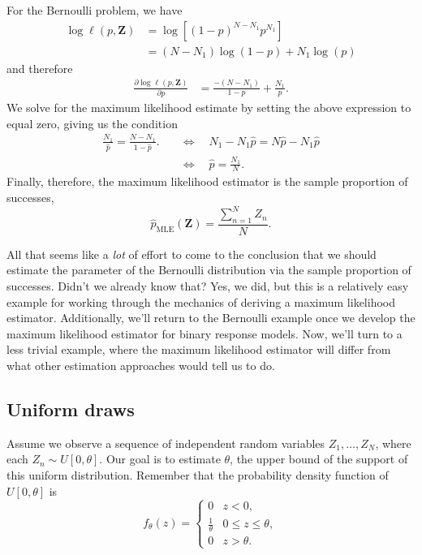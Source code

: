 \documentclass[
  12pt,
  oneside,openany]{book}
\begin{document}
For the Bernoulli problem, we have
\[
\begin{aligned}
\log \ell(p, \mathbf{Z}) &= \log \left[ (1 - p)^{N - N_1} p^{N_1} \right] \\
&= (N - N_1) \log(1 - p) + N_1 \log(p)
\end{aligned}
\]
and therefore
\[
\begin{aligned}
\frac{\partial \log \ell(p, \mathbf{Z})}{\partial p}
&= \frac{-(N - N_1)}{1 - p} + \frac{N_1}{p}.
\end{aligned}
\]
We solve for the maximum likelihood estimate by setting the above expression to equal zero, giving us the condition
\[
\begin{aligned}
\frac{N_1}{\hat{p}} = \frac{N - N_1}{1 - \hat{p}}.
&\quad\Leftrightarrow\quad N_1 - N_1 \hat{p} = N \hat{p} - N_1 \hat{p} \\
&\quad\Leftrightarrow\quad \hat{p} = \frac{N_1}{N}.
\end{aligned}
\]
Finally, therefore, the maximum likelihood estimator is the sample proportion of successes,
\[
\hat{p}_{\text{MLE}}(\mathbf{Z}) = \frac{\sum_{n=1}^N Z_n}{N}.
\]

All that seems like a \emph{lot} of effort to come to the conclusion that we should estimate the parameter of the Bernoulli distribution via the sample proportion of successes.
Didn't we already know that?
Yes, we did, but this is a relatively easy example for working through the mechanics of deriving a maximum likelihood estimator.
Additionally, we'll return to the Bernoulli example once we develop the maximum likelihood estimator for binary response models.
Now, we'll turn to a less trivial example, where the maximum likelihood estimator will differ from what other estimation approaches would tell us to do.

\hypertarget{uniform-draws}{%
\subsection{Uniform draws}\label{uniform-draws}}

Assume we observe a sequence of independent random variables \(Z_1, \ldots, Z_N\), where each \(Z_n \sim U[0, \theta]\).
Our goal is to estimate \(\theta\), the upper bound of the support of this uniform distribution.
Remember that the probability density function of \(U[0, \theta]\) is
\[
f_\theta(z) = \begin{cases}
0 & z < 0, \\
\frac{1}{\theta} & 0 \leq z \leq \theta, \\
0 & z > \theta.
\end{cases}
\]
\end{document}
